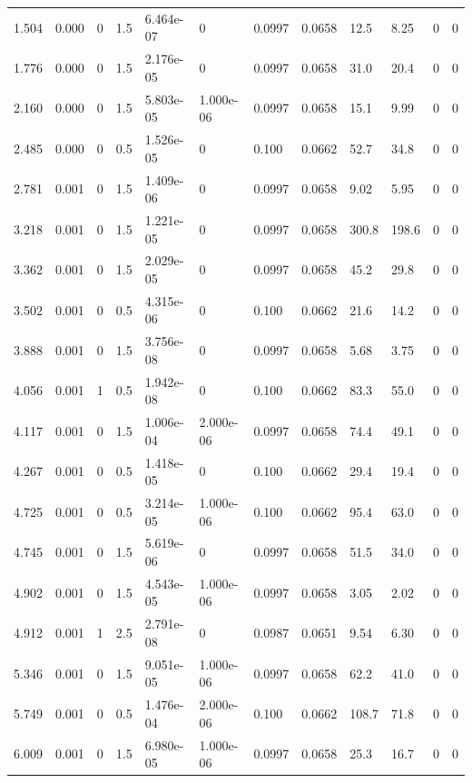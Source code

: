 \documentclass[preview]{standalone}
\begin{document}
{{\begin{tabular}{L{1.2cm}C{1.2cm} C{0.3cm}C{0.5cm} C{1.4cm}C{1.4cm} C{1.4cm}C{1.4cm} C{1.6cm}C{1.6cm} C{1.6cm}C{1.6cm}}
  1.504  &  0.000  & 0     & 1.5 &  6.464e-07  & 0  &  0.0997&   0.0658& 12.5 & 8.25   &  0 & 0  \\ 
  1.776  &  0.000  & 0     & 1.5 &  2.176e-05  & 0  &  0.0997&   0.0658& 31.0 & 20.4   &  0 & 0  \\ 
  2.160  &  0.000  & 0     & 1.5 &  5.803e-05  & 1.000e-06  &  0.0997&   0.0658& 15.1 & 9.99   &  0 & 0  \\ 
  2.485  &  0.000  & 0     & 0.5 &  1.526e-05  & 0  &  0.100&   0.0662& 52.7 & 34.8   &  0 & 0  \\ 
  2.781  &  0.001  & 0     & 1.5 &  1.409e-06  & 0  &  0.0997&   0.0658& 9.02 & 5.95   &  0 & 0  \\ 
  3.218  &  0.001  & 0     & 1.5 &  1.221e-05  & 0  &  0.0997&   0.0658& 300.8 & 198.6   &  0 & 0  \\ 
  3.362  &  0.001  & 0     & 1.5 &  2.029e-05  & 0  &  0.0997&   0.0658& 45.2 & 29.8   &  0 & 0  \\ 
  3.502  &  0.001  & 0     & 0.5 &  4.315e-06  & 0  &  0.100&   0.0662& 21.6 & 14.2   &  0 & 0  \\ 
  3.888  &  0.001  & 0     & 1.5 &  3.756e-08  & 0  &  0.0997&   0.0658& 5.68 & 3.75   &  0 & 0  \\ 
  4.056  &  0.001  & 1     & 0.5 &  1.942e-08  & 0  &  0.100&   0.0662& 83.3 & 55.0   &  0 & 0  \\ 
  4.117  &  0.001  & 0     & 1.5 &  1.006e-04  & 2.000e-06  &  0.0997&   0.0658& 74.4 & 49.1   &  0 & 0  \\ 
  4.267  &  0.001  & 0     & 0.5 &  1.418e-05  & 0  &  0.100&   0.0662& 29.4 & 19.4   &  0 & 0  \\ 
  4.725  &  0.001  & 0     & 0.5 &  3.214e-05  & 1.000e-06  &  0.100&   0.0662& 95.4 & 63.0   &  0 & 0  \\ 
  4.745  &  0.001  & 0     & 1.5 &  5.619e-06  & 0  &  0.0997&   0.0658& 51.5 & 34.0   &  0 & 0  \\ 
  4.902  &  0.001  & 0     & 1.5 &  4.543e-05  & 1.000e-06  &  0.0997&   0.0658& 3.05 & 2.02   &  0 & 0  \\ 
  4.912  &  0.001  & 1     & 2.5 &  2.791e-08  & 0  &  0.0987&   0.0651& 9.54 & 6.30   &  0 & 0  \\ 
  5.346  &  0.001  & 0     & 1.5 &  9.051e-05  & 1.000e-06  &  0.0997&   0.0658& 62.2 & 41.0   &  0 & 0  \\ 
  5.749  &  0.001  & 0     & 0.5 &  1.476e-04  & 2.000e-06  &  0.100&   0.0662& 108.7 & 71.8   &  0 & 0  \\ 
  6.009  &  0.001  & 0     & 1.5 &  6.980e-05  & 1.000e-06  &  0.0997&   0.0658& 25.3 & 16.7   &  0 & 0  \\ 

\end{tabular}}}
\end{document}
